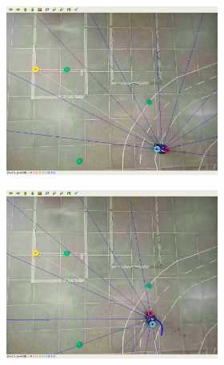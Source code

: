 \vspace{0.25cm}
\begin{figure}[H]
\caption{Imagens sequência do experimento no Turtlebot3 no primeiro ambiente real}
    \begin{center}
    \begin{subfigure}[b]{0.60\textwidth}
        \begin{subfigure}[b]{0.24\textwidth}
            \includegraphics[width=\textwidth]{imagens/real_envs/real_env1_ddpg/1.png}
        \end{subfigure}
        \hfill
        \begin{subfigure}[b]{0.24\textwidth}
            \includegraphics[width=\textwidth]{imagens/real_envs/real_env1_ddpg/2.png}

\end{subfigure}
\end{subfigure}
\end{center}
\end{figure}
